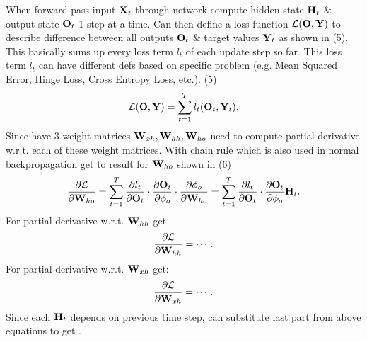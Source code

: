 \documentclass{article}
\begin{document}
\begin{enumerate}
\begin{itemize}
		When forward pass input ${\bf X}_t$ through network compute hidden state ${\bf H}_t$ \& output state ${\bf O}_t$ 1 step at a time. Can then define a loss function ${\cal L}({\bf O},{\bf Y})$ to describe difference between all outputs ${\bf O}_t$ \& target values ${\bf Y}_t$ as shown in (5). This basically sums up every loss term $l_t$ of each update step so far. This loss term $l_t$ can have different defs based on specific problem (e.g. Mean Squared Error, Hinge Loss, Cross Entropy Loss, etc.). (5)
		\begin{equation}
			{\cal L}({\bf O},{\bf Y}) = \sum_{t=1}^T l_t({\bf O}_t,{\bf Y}_t).
		\end{equation}
		Since have 3 weight matrices ${\bf W}_{xh},{\bf W}_{hh},{\bf W}_{ho}$ need to compute partial derivative w.r.t. each of these weight matrices. With chain rule which is also used in normal backpropagation get to result for ${\bf W}_{ho}$ shown in (6)
		\begin{equation}
			\frac{\partial{\cal L}}{\partial{\bf W}_{ho}} = \sum_{t=1}^T \frac{\partial l_t}{\partial{\bf O}_t}\cdot\frac{\partial{\bf O}_t}{\partial\phi_o}\cdot\frac{\partial\phi_o}{\partial{\bf W}_{ho}} = \sum_{t=1}^T \frac{\partial l_t}{\partial{\bf O}_t}\cdot\frac{\partial{\bf O}_t}{\partial\phi_o}{\bf H}_t.
		\end{equation}
		For partial derivative w.r.t. ${\bf W}_{hh}$ get
		\begin{equation}
			\frac{\partial{\cal L}}{\partial{\bf W}_{hh}} = \cdots.
		\end{equation}
		For partial derivative w.r.t. ${\bf W}_{xh}$ get:
		\begin{equation}
			\frac{\partial{\cal L}}{\partial{\bf W}_{xh}} = \cdots.
		\end{equation}
		Since each ${\bf H}_t$ depends on previous time step, can substitute last part from above equations to get {\sf[(9)--(12)]}.
		

\end{itemize}
\end{enumerate}
\end{document}
